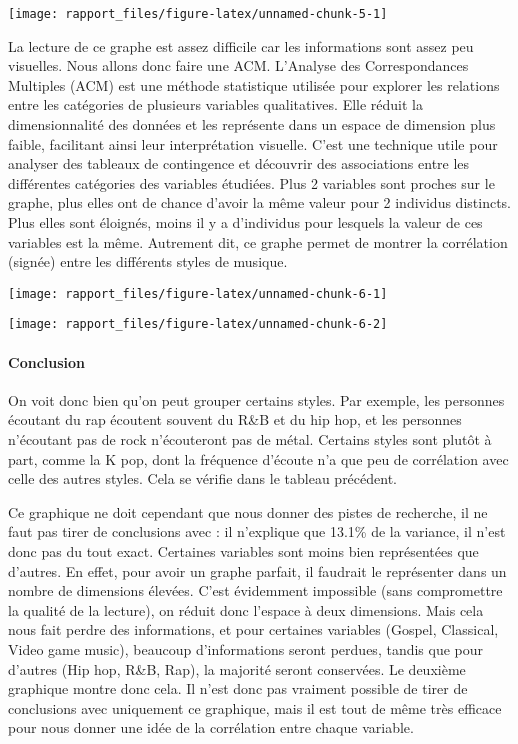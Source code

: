 \documentclass[
]{article}
\begin{document}
\begin{center}\texttt{[image: rapport\_files/figure-latex/unnamed-chunk-5-1]} \end{center}

La lecture de ce graphe est assez difficile car les informations sont
assez peu visuelles. Nous allons donc faire une ACM. L'Analyse des
Correspondances Multiples (ACM) est une méthode statistique utilisée
pour explorer les relations entre les catégories de plusieurs variables
qualitatives. Elle réduit la dimensionnalité des données et les
représente dans un espace de dimension plus faible, facilitant ainsi
leur interprétation visuelle. C'est une technique utile pour analyser
des tableaux de contingence et découvrir des associations entre les
différentes catégories des variables étudiées. Plus 2 variables sont
proches sur le graphe, plus elles ont de chance d'avoir la même valeur
pour 2 individus distincts. Plus elles sont éloignés, moins il y a
d'individus pour lesquels la valeur de ces variables est la même.
Autrement dit, ce graphe permet de montrer la corrélation (signée) entre
les différents styles de musique.

\begin{center}\texttt{[image: rapport\_files/figure-latex/unnamed-chunk-6-1]} \end{center}

\begin{center}\texttt{[image: rapport\_files/figure-latex/unnamed-chunk-6-2]} \end{center}

\paragraph{\texorpdfstring{\textbf{Conclusion}}{Conclusion}}\label{conclusion-2}

On voit donc bien qu'on peut grouper certains styles. Par exemple, les
personnes écoutant du rap écoutent souvent du R\&B et du hip hop, et les
personnes n'écoutant pas de rock n'écouteront pas de métal. Certains
styles sont plutôt à part, comme la K pop, dont la fréquence d'écoute
n'a que peu de corrélation avec celle des autres styles. Cela se vérifie
dans le tableau précédent.

Ce graphique ne doit cependant que nous donner des pistes de recherche,
il ne faut pas tirer de conclusions avec : il n'explique que 13.1\% de
la variance, il n'est donc pas du tout exact. Certaines variables sont
moins bien représentées que d'autres. En effet, pour avoir un graphe
parfait, il faudrait le représenter dans un nombre de dimensions
élevées. C'est évidemment impossible (sans compromettre la qualité de la
lecture), on réduit donc l'espace à deux dimensions. Mais cela nous fait
perdre des informations, et pour certaines variables (Gospel, Classical,
Video game music), beaucoup d'informations seront perdues, tandis que
pour d'autres (Hip hop, R\&B, Rap), la majorité seront conservées. Le
deuxième graphique montre donc cela. Il n'est donc pas vraiment possible
de tirer de conclusions avec uniquement ce graphique, mais il est tout
de même très efficace pour nous donner une idée de la corrélation entre
chaque variable.
\end{document}
